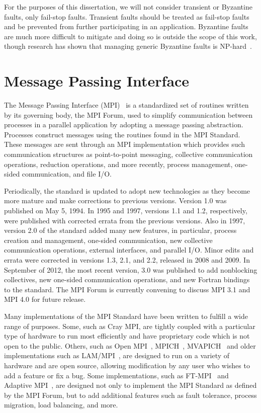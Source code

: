 For the purposes of this dissertation, we will not consider transient or 
Byzantine faults, only fail-stop faults. Transient faults should be treated as fail-stop faults and be prevented from further participating in an application. Byzantine faults are much more difficult to mitigate and doing so is outside the scope of this work, though research has shown that managing generic Byzantine faults is NP-hard~\cite{Kulkarni:2000wk}.

\section{Message Passing Interface}
\label{sec:background:mpi}

The Message Passing Interface (MPI)~\cite{MPI30} is a standardized set of routines
written by its governing body, the MPI Forum, used to simplify communication
between processes in a parallel application by adopting a message passing
abstraction. Processes construct messages using the routines found in the
MPI Standard. These messages are sent through an MPI implementation which
provides such communication structures as point-to-point messaging, collective
communication operations, reduction operations, and more recently, process
management, one-sided communication, and file I/O. 

Periodically, the standard is updated to adopt new technologies as they become 
more mature and make corrections to previous versions. Version 1.0 was published 
on May 5, 1994. In 1995 and 1997, versions 1.1 and 1.2, respectively, were 
published with corrected errata from the previous versions. Also in 1997, 
version 2.0 of the standard added many new features, in particular, process 
creation and management, one-sided communication, new collective communication 
operations, external interfaces, and parallel I/O. Minor edits and errata were 
corrected in versions 1.3, 2.1, and 2.2, released in 2008 and 2009. In September 
of 2012, the most recent version, 3.0 was published to add nonblocking 
collectives, new one-sided communication operations, and new Fortran bindings to 
the standard. The MPI Forum is currently convening to discuss MPI 3.1 and MPI 
4.0 for future release.

Many implementations of the MPI Standard have been written to fulfill a wide
range of purposes. Some, such as Cray MPI, are tightly coupled with a
particular type of hardware to run most efficiently and have proprietary code
which is not open to the public. Others, such as Open MPI~\cite{openmpi, Gabriel:2004ub}, 
MPICH~\cite{mpich, Bridges:1995tr}, MVAPICH~\cite{mvapich2, Huang:cr}
and older implementations such as LAM/MPI~\cite{burns94:lam, squyres03:compon-archit-lam-mpi}, are designed to run on a
variety of hardware and are open source, allowing modification by any user who
wishes to add a feature or fix a bug. Some implementations, such as
FT-MPI~\cite{FaggFTMPI} and Adaptive MPI~\cite{AmpiIPDPS00}, are designed not only to
implement the MPI Standard as defined by the MPI Forum, but to add additional
features such as fault tolerance, process migration, load balancing, and more.

